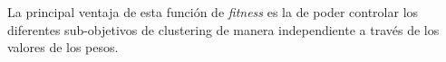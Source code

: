     La principal ventaja de esta función de \emph{fitness} es la de poder
controlar los diferentes sub-objetivos de clustering de manera independiente a
través de los valores de los pesos.

